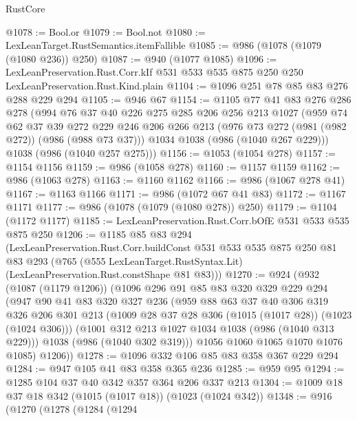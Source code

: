 \begin{lexlean}{RustCore}
\begin{coremodule}
@1078 := Bool.or
@1079 := Bool.not
@1080 := LexLeanTarget.RustSemantics.itemFallible
@1085 := @986 (@1078 (@1079 (@1080 @236)) @250)
@1087 := @940 (@1077 @1085)
@1096 := LexLeanPreservation.Rust.Corr.kIf
    @531
    @533
    @535
    @875
    @250
    @250
    LexLeanPreservation.Rust.Kind.plain
@1104 := @1096 @251 @78 @85 @83 @276 @288 @229 @294
@1105 := @946 @67
@1154 := @1105
    @77
    @41
    @83
    @276
    @286
    @278
    (@994
      @76
      @37
      @40
      @226
      @275
      @285
      @206
      @256
      @213
      @1027
      (@959
        @74
        @62
        @37
        @39
        @272
        @229
        @246
        @206
        @266
        @213
        (@976 @73 @272 (@981 (@982 @272)) (@986 (@988 @73 @37)))
        @1034
        @1038
        (@986 (@1040 @267 @229)))
      @1038
      (@986 (@1040 @257 @275)))
@1156 := @1053 (@1054 @278)
@1157 := @1154 @1156
@1159 := @986 (@1058 @278)
@1160 := @1157 @1159
@1162 := @986 (@1063 @278)
@1163 := @1160 @1162
@1166 := @986 (@1067 @278 @41)
@1167 := @1163 @1166
@1171 := @986 (@1072 @67 @41 @83)
@1172 := @1167 @1171
@1177 := @986 (@1078 (@1079 (@1080 @278)) @250)
@1179 := @1104 (@1172 @1177)
@1185 := LexLeanPreservation.Rust.Corr.bOfE @531 @533 @535 @875 @250
@1206 := @1185
    @85
    @83
    @294
    (LexLeanPreservation.Rust.Corr.buildConst
      @531
      @533
      @535
      @875
      @250
      @81
      @83
      @293
      (@765 (@555 LexLeanTarget.RustSyntax.Lit) (LexLeanPreservation.Rust.constShape @81 @83)))
@1270 := @924
    (@932
      (@1087 (@1179 @1206))
      (@1096
        @296
        @91
        @85
        @83
        @320
        @329
        @229
        @294
        (@947
          @90
          @41
          @83
          @320
          @327
          @236
          (@959
            @88
            @63
            @37
            @40
            @306
            @319
            @326
            @206
            @301
            @213
            (@1009 @28 @37 @28 @306 (@1015 (@1017 @28)) (@1023 (@1024 @306)))
            (@1001 @312 @213 @1027 @1034 @1038 (@986 (@1040 @313 @229)))
            @1038
            (@986 (@1040 @302 @319)))
          @1056
          @1060
          @1065
          @1070
          @1076
          @1085)
        @1206))
@1278 := @1096 @332 @106 @85 @83 @358 @367 @229 @294
@1284 := @947 @105 @41 @83 @358 @365 @236
@1285 := @959 @95
@1294 := @1285 @104 @37 @40 @342 @357 @364 @206 @337 @213
@1304 := @1009 @18 @37 @18 @342 (@1015 (@1017 @18)) (@1023 (@1024 @342))
@1348 := @916
    (@1270
      (@1278
        (@1284
          (@1294

\end{coremodule}
\end{lexlean}
